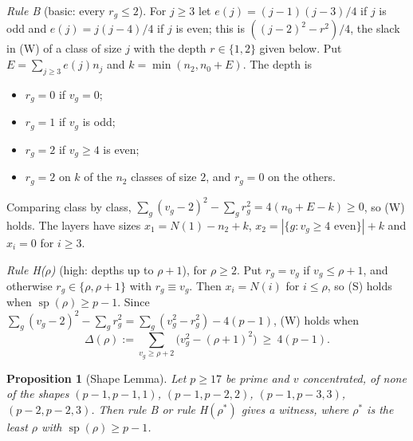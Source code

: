 \documentclass[11pt]{article}
\newtheorem{proposition}[lemma]{Proposition}
\theoremstyle{remark}
\begin{document}
\emph{Rule B} (basic: every $r_g\le2$). For $j\ge3$ let $e(j)=(j-1)(j-3)/4$ if $j$ is odd and $e(j)=j(j-4)/4$ if $j$ is even; this is $((j-2)^2-r^2)/4$, the slack in (W) of a class of size $j$ with the depth $r\in\{1,2\}$ given below. Put $E=\sum_{j\ge3}e(j)n_j$ and $k=\min(n_2,n_0+E)$. The depth is
\begin{itemize}
\item $r_g=0$ if $v_g=0$;
\item $r_g=1$ if $v_g$ is odd;
\item $r_g=2$ if $v_g\ge4$ is even;
\item $r_g=2$ on $k$ of the $n_2$ classes of size $2$, and $r_g=0$ on the others.
\end{itemize}
Comparing class by class, $\sum_g(v_g-2)^2-\sum_g r_g^2=4(n_0+E-k)\ge0$, so (W) holds. The layers have sizes $x_1=N(1)-n_2+k$, $x_2=|\{g:v_g\ge4\text{ even}\}|+k$ and $x_i=0$ for $i\ge3$.

\emph{Rule H($\rho$)} (high: depths up to $\rho+1$), for $\rho\ge2$. Put $r_g=v_g$ if $v_g\le\rho+1$, and otherwise $r_g\in\{\rho,\rho+1\}$ with $r_g\equiv v_g$. Then $x_i=N(i)$ for $i\le\rho$, so (S) holds when $\operatorname{sp}(\rho)\ge p-1$. Since $\sum_g(v_g-2)^2-\sum_g r_g^2=\sum_g(v_g^2-r_g^2)-4(p-1)$, (W) holds when
\[
\Delta(\rho):=\sum_{v_g\ge\rho+2}\bigl(v_g^2-(\rho+1)^2\bigr)\ \ge\ 4(p-1).
\]

\begin{proposition}[Shape Lemma]\label{prop:shape}
Let $p\ge17$ be prime and $v$ concentrated, of none of the shapes $(p-1,p-1,1)$, $(p-1,p-2,2)$, $(p-1,p-3,3)$, $(p-2,p-2,3)$. Then rule B or rule H$(\rho^*)$ gives a witness, where $\rho^*$ is the least $\rho$ with $\operatorname{sp}(\rho)\ge p-1$.
\end{proposition}
\end{document}
